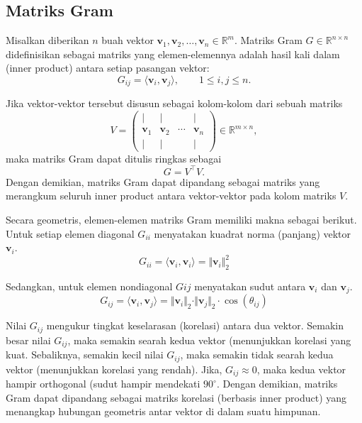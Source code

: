 \subsection{Matriks Gram}

Misalkan diberikan $n$ buah vektor $\mathbf{v}_1, \mathbf{v}_2, \ldots, \mathbf{v}_n \in \mathbb{R}^m$.
Matriks Gram $G \in \mathbb{R}^{n \times n}$ didefinisikan sebagai matriks yang elemen-elemennya adalah hasil kali dalam (inner product) antara setiap pasangan vektor:
$$
    G_{ij} = \langle \mathbf{v}_i, \mathbf{v}_j \rangle, \qquad 1 \leq i,j \leq n.
$$

Jika vektor-vektor tersebut disusun sebagai kolom-kolom dari sebuah matriks
$$
    V =
    \begin{pmatrix}
        \vert & \vert &        & \vert \\
        \mathbf{v}_1 & \mathbf{v}_2 & \cdots & \mathbf{v}_n \\
        \vert & \vert &        & \vert
    \end{pmatrix}
    \in \mathbb{R}^{m \times n},
$$
maka matriks Gram dapat ditulis ringkas sebagai
$$
    G = V^\top V.
$$
Dengan demikian, matriks Gram dapat dipandang sebagai matriks yang merangkum seluruh inner product antara vektor-vektor pada kolom matriks $V$.

Secara geometris, elemen-elemen matriks Gram memiliki makna sebagai berikut. Untuk setiap elemen diagonal $G_{ii}$ menyatakan kuadrat norma (panjang) vektor $\mathbf{v}_i$. 
$$
    G_{ii} = \langle \mathbf{v}_i, \mathbf{v}_i \rangle = \Vert \mathbf{v}_i \Vert_2^2
$$

Sedangkan, untuk elemen nondiagonal $G{ij}$ menyatakan sudut antara $\mathbf{v}_i$ dan $\mathbf{v}_j$.
$$
    G_{ij} = \langle \mathbf{v}_i, \mathbf{v}_j \rangle = \Vert \mathbf{v}_i \Vert_2  \cdot \Vert \mathbf{v}_j \Vert_2 \cdot \cos(\theta_{ij})
$$

Nilai $G_{ij}$ mengukur tingkat keselarasan (korelasi) antara dua vektor. Semakin besar nilai $G_{ij}$, maka semakin searah kedua vektor (menunjukkan korelasi yang kuat. Sebaliknya, semakin kecil nilai $G_{ij}$, maka semakin tidak searah kedua vektor (menunjukkan korelasi yang rendah). Jika, $G_{ij} \approx 0$, maka kedua vektor hampir orthogonal (sudut hampir mendekati $90^\circ$. Dengan demikian, matriks Gram dapat dipandang sebagai matriks korelasi (berbasis inner product) yang menangkap hubungan geometris antar vektor di dalam suatu himpunan.

